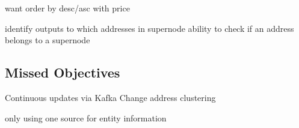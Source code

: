 want order by desc/asc with price

identify outputs to which addresses in supernode
ability to check if an address belongs to a supernode 


\subsection{Missed Objectives}
Continuous updates via Kafka
Change address clustering


only using one source for entity information 

